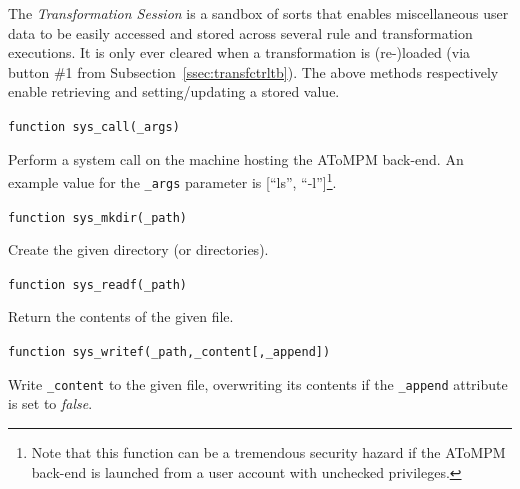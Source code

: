 \documentclass{article}
\numberwithin{equation}{section}
\numberwithin{figure}{section}
\begin{document}
The \textit{Transformation Session} is a sandbox of sorts that enables miscellaneous user data to be easily accessed and stored across several rule and transformation executions. It is only ever cleared when a transformation is (re-)loaded (via button \#1 from Subsection~\ref{ssec:transfctrltb}). The above methods respectively enable retrieving and setting/updating a stored value.\\
\vspace*{1em}


\begin{center}	{\large \texttt{function sys\_call(\_args)}} \end{center}

Perform a system call on the machine hosting the AToMPM back-end. An example value for the \texttt{\_args} parameter is [``ls'', ``-l'']\footnote{Note that this function can be a tremendous security hazard if the AToMPM back-end is launched from a user account with unchecked privileges.}.\\
\vspace*{1em}


\begin{center}	{\large \texttt{function sys\_mkdir(\_path)}} \end{center}

Create the given directory (or directories).\\
\vspace*{1em}


\begin{center}	{\large \texttt{function sys\_readf(\_path)}} \end{center}

Return the contents of the given file.\\
\vspace*{1em}


\begin{center}	{\large \texttt{function sys\_writef(\_path,\_content[,\_append])}} \end{center}

Write \texttt{\_content} to the given file, overwriting its contents if the \texttt{\_append} attribute is set to \textit{false}.
\end{document}
